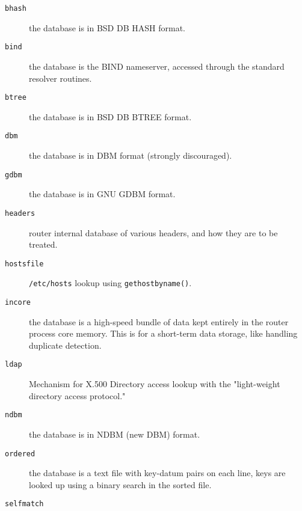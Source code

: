\begin{description}
\item[{\tt bhash}] \mbox{}

the database is in BSD DB HASH format.

\item[{\tt bind}] \mbox{}

the database is the BIND nameserver, accessed through the standard resolver routines.

\item[{\tt btree}] \mbox{}

the database is in BSD DB BTREE format.

\item[{\tt dbm}] \mbox{}

the database is in DBM format (strongly discouraged).

\item[{\tt gdbm}] \mbox{}

the database is in GNU GDBM format.

\item[{\tt headers}] \mbox{}

router internal database of various headers, and how they are
to be treated.

\item[{\tt hostsfile}] \mbox{}

{\tt /etc/hosts} lookup using {\tt gethostbyname()}.

\item[{\tt incore}] \mbox{}

the database is a high-speed bundle of data kept entirely in the router process core memory.  This is for a short-term data storage, like handling duplicate detection.

\item[{\tt ldap}] \mbox{}

Mechanism for X.500 Directory access lookup with the "light-weight
directory access protocol."

\item[{\tt ndbm}] \mbox{}

the database is in NDBM (new DBM) format.

\item[{\tt ordered}] \mbox{}

the database is a text file with key-datum pairs on each line, keys are looked up using a binary search in the sorted file.

\item[{\tt selfmatch}] \mbox{}


\end{description}
